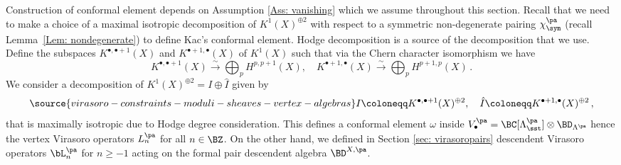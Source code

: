 Construction of conformal element depends on Assumption \ref{Ass: vanishing} which we assume throughout this section. Recall that we need to make a choice of a maximal isotropic decomposition of $K^1(X)^{\oplus 2}$ with respect to a symmetric non-degenerate pairing $\chi^{\pa}_\sym$ (recall Lemma~\ref{Lem: nondegenerate}) to define Kac's conformal element. Hodge decomposition is a source of the decomposition that we use. Define the subspaces $K^{\bullet,\bullet+1}(X)$ and $K^{\bullet+1,\bullet}(X)$ of $K^1(X)$ such that via the Chern character isomorphism we have
$$K^{\bullet,\bullet+1}(X)\xrightarrow{\sim}\bigoplus_{p}H^{p,p+1}(X),\quad K^{\bullet+1,\bullet}(X)\xrightarrow{\sim}\bigoplus_{p}H^{p+1,p}(X)\,.
$$
We consider a decomposition of $K^1(X)^{\oplus 2}=I\oplus \hat{I}$ given by
\begin{equation}\label{Hodge isotropic decomposition}
\source{virasoro-constraints-moduli-sheaves-vertex-algebras}
    I\coloneqq K^{\bullet,\bullet+1}(X)^{\oplus 2},\quad \hat{I}\coloneqq K^{\bullet+1,\bullet}(X)^{\oplus 2}\,,
\end{equation}
that is maximally isotropic due to Hodge degree consideration. This defines a conformal element $\omega$ inside $V_\bullet^{\pa}=\BC[\Lambda^{\pa}_{\sst}]\otimes \BD_{\Lambda^{\pa}}$ hence the vertex Virasoro operators $L_n^{\pa}$ for all $n\in\BZ$. On the other hand, we defined in Section \ref{sec: virasoropairs} descendent Virasoro operators $\bL_n^{\pa}$ for $n\geq -1$ acting on the formal pair descendent algebra $\BD^{X,\pa}$.

